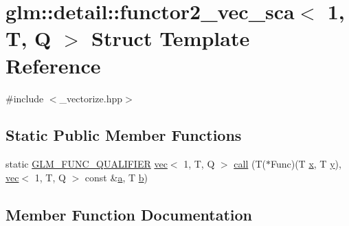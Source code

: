 \hypertarget{structglm_1_1detail_1_1functor2__vec__sca_3_011_00_01_t_00_01_q_01_4}{}\section{glm\+:\+:detail\+:\+:functor2\+\_\+vec\+\_\+sca$<$ 1, T, Q $>$ Struct Template Reference}
\label{structglm_1_1detail_1_1functor2__vec__sca_3_011_00_01_t_00_01_q_01_4}


{\ttfamily \#include $<$\+\_\+vectorize.\+hpp$>$}

\subsection*{Static Public Member Functions}
\begin{DoxyCompactItemize}
\item 
static \mbox{\hyperlink{setup_8hpp_a33fdea6f91c5f834105f7415e2a64407}{G\+L\+M\+\_\+\+F\+U\+N\+C\+\_\+\+Q\+U\+A\+L\+I\+F\+I\+ER}} \mbox{\hyperlink{structglm_1_1vec}{vec}}$<$ 1, T, Q $>$ \mbox{\hyperlink{structglm_1_1detail_1_1functor2__vec__sca_3_011_00_01_t_00_01_q_01_4_a89645239c9fe91ac369acd3bc5cd544f}{call}} (T($\ast$Func)(T \mbox{\hyperlink{_s_d_l__opengl_8h_ad0e63d0edcdbd3d79554076bf309fd47}{x}}, T \mbox{\hyperlink{_s_d_l__opengl_8h_a1675d9d7bb68e1657ff028643b4037e3}{y}}), \mbox{\hyperlink{structglm_1_1vec}{vec}}$<$ 1, T, Q $>$ const \&\mbox{\hyperlink{_s_d_l__opengl__glext_8h_a3309789fc188587d666cda5ece79cf82}{a}}, T \mbox{\hyperlink{_s_d_l__opengl__glext_8h_a0f71581a41fd2264c8944126dabbd010}{b}})
\end{DoxyCompactItemize}


\subsection{Member Function Documentation}
\mbox{\label{structglm_1_1detail_1_1functor2__vec__sca_3_011_00_01_t_00_01_q_01_4_a89645239c9fe91ac369acd3bc5cd544f}} 
